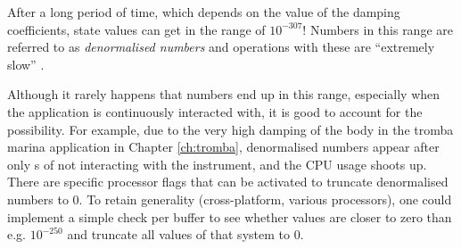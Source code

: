 After a long period of time, which depends on the value of the damping coefficients, state values can get in the range of \textApprox$10^{-307}$! Numbers in this range are referred to as \textit{denormalised numbers} and operations with these are ``extremely slow'' \cite{CPPdenormalised}.

Although it rarely happens that numbers end up in this range, especially when the application is continuously interacted with, it is good to account for the possibility. For example, due to the very high damping of the body in the tromba marina application in Chapter \ref{ch:tromba}, denormalised numbers appear after only  s of not interacting with the instrument, and the CPU usage shoots up. There are specific processor flags that can be activated to truncate denormalised numbers to 0. To retain generality (cross-platform, various processors), one could implement a simple check per buffer to see whether values are closer to zero than e.g. $10^{-250}$ and truncate all values of that system to $0$. 


